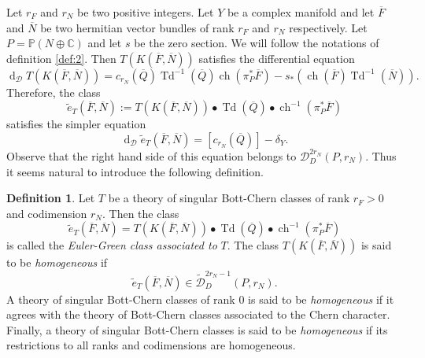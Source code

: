 \documentclass[10pt,twoside]{article}
\numberwithin{equation}{section}
\theoremstyle{plain}
\theoremstyle{definition}
\newtheorem{definition}[equation]{Definition}
\DeclareMathOperator{\Td}{Td}
\DeclareMathOperator{\dd}{d}
\DeclareMathOperator{\ch}{ch}
\begin{document}
Let $r_{F}$ and $r_{N}$ be two positive integers. Let $Y$ be a
complex manifold and let $\overline F$ and $\overline N$ be two
hermitian 
vector bundles of rank $r_{F}$ and $r_{N}$ respectively. Let
$P=\mathbb{P}(N\oplus \mathbb{C})$ and let $s$ be the zero section. We
will follow the notations of 
definition \ref{def:2}. Then $T(K(\overline F,\overline N))$
satisfies the differential equation
\begin{displaymath}
  \dd_{\mathcal{D}} T(K(\overline
F,\overline N))=c_{r_{N}}(\overline Q)\Td^{-1}(\overline Q)\ch(\pi
_{P}^{\ast}\overline F)-s_{\ast}(\ch(\overline F)\Td^{-1}(\overline
N)). 
\end{displaymath}
Therefore, the class
\begin{displaymath}
  \widetilde e_{T}(\overline F,\overline N):= T(K(\overline
F,\overline N))\bullet \Td(\overline Q)\bullet\ch^{-1}(\pi
_{P}^{\ast}\overline F)
\end{displaymath}
satisfies the simpler equation
\begin{equation}\label{eq:69}
  \dd_{\mathcal{D}}\widetilde e_{T}(\overline F,\overline N)=
  [c_{r_{N}}(\overline Q)]-\delta _{Y}.
\end{equation}
Observe that the right hand side of this equation belongs to
$\mathcal{D}^{2r_{N}}_{D}(P,r_{N})$. Thus it seems natural to
introduce the following definition.
\begin{definition} \label{def:16}
  Let $T$ be a theory of singular Bott-Chern classes of rank $r_{F}>0$
  and codimension $r_{N}$. Then the class
  \begin{displaymath}
  \widetilde e_{T}(\overline F,\overline N)= T(K(\overline
F,\overline N))\bullet \Td(\overline Q)\bullet\ch^{-1}(\pi
_{P}^{\ast}\overline F)    
  \end{displaymath}
  is called the \emph{Euler-Green class associated to} $T$.
The class $T(K(\overline
F,\overline N))$ is said to be \emph{homogeneous} if
  \begin{displaymath}
    \widetilde e_{T}(\overline F,\overline N) \in \widetilde
{\mathcal{D}}^{2r_{N}-1}_{D}(P,r_{N}). 
  \end{displaymath}
  A theory of singular Bott-Chern classes of rank $0$ is said to be
  \emph{homogeneous} if it agrees with the theory of 
  Bott-Chern classes associated to the Chern character.  Finally, a
  theory of singular Bott-Chern classes 
  is said to be \emph{homogeneous} if its restrictions to all
  ranks and codimensions are homogeneous.  
\end{definition}
\end{document}
